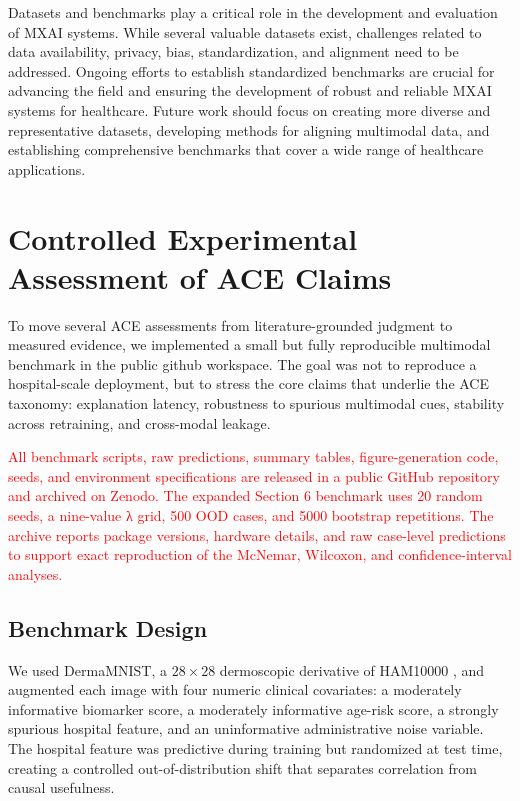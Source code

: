 \documentclass[pdflatex,sn-mathphys-num]{sn-jnl}%
\theoremstyle{thmstyleone}%
\theoremstyle{thmstyletwo}%
\theoremstyle{thmstylethree}%
\begin{document}
\begin{itemize}
Datasets and benchmarks play a critical role in the development and evaluation of MXAI systems. While several valuable datasets exist, challenges related to data availability, privacy, bias, standardization, and alignment need to be addressed. Ongoing efforts to establish standardized benchmarks are crucial for advancing the field and ensuring the development of robust and reliable MXAI systems for healthcare. Future work should focus on creating more diverse and representative datasets, developing methods for aligning multimodal data, and establishing comprehensive benchmarks that cover a wide range of healthcare applications.


\section{Controlled Experimental Assessment of ACE Claims}
\label{sec:controlled_experiments}

To move several ACE assessments from literature-grounded judgment to measured evidence, we implemented a small but fully reproducible multimodal benchmark in the public github workspace. The goal was not to reproduce a hospital-scale deployment, but to stress the core claims that underlie the ACE taxonomy: explanation latency, robustness to spurious multimodal cues, stability across retraining, and cross-modal leakage.

\textcolor{red}{All benchmark scripts, raw predictions, summary tables, figure-generation code, seeds, and environment specifications are released in a public GitHub repository and archived on Zenodo. The expanded Section 6 benchmark uses 20 random seeds, a nine-value λ grid, 500 OOD cases, and 5000 bootstrap repetitions. The archive reports package versions, hardware details, and raw case-level predictions to support exact reproduction of the McNemar, Wilcoxon, and confidence-interval analyses. }

\subsection{Benchmark Design}

We used DermaMNIST, a $28 \times 28$ dermoscopic derivative of HAM10000 \cite{Tschandl_2018}, and augmented each image with four numeric clinical covariates: a moderately informative biomarker score, a moderately informative age-risk score, a strongly spurious hospital feature, and an uninformative administrative noise variable. The hospital feature was predictive during training but randomized at test time, creating a controlled out-of-distribution shift that separates correlation from causal usefulness.


\end{itemize}
\end{document}
